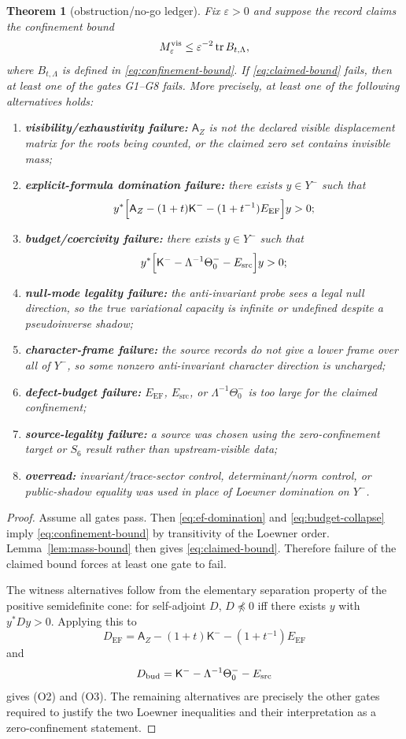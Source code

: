 \documentclass[11pt]{article}
\newtheorem{theorem}{Theorem}
\newcommand{\K}{\mathsf K}
\newcommand{\A}{\mathsf A}
\newcommand{\EF}{\mathrm{EF}}
\newcommand{\src}{\mathrm{src}}
\newcommand{\tr}{\operatorname{tr}}
\newcommand{\eps}{\varepsilon}
\begin{document}
\begin{theorem}[obstruction/no-go ledger]\label{thm:obstruction}
Fix $\eps>0$ and suppose the record claims the confinement bound
\begin{equation}\label{eq:claimed-bound}
M_{\eps}^{\rm vis}\le \eps^{-2}\tr B_{t,\Lambda},
\end{equation}
where $B_{t,\Lambda}$ is defined in \eqref{eq:confinement-bound}.  If \eqref{eq:claimed-bound} fails, then at least one of the gates G1--G8 fails.  More precisely, at least one of the following alternatives holds:
\begin{enumerate}[label=(O\arabic*),leftmargin=3em]
  \item \textbf{visibility/exhaustivity failure:} $\A_Z$ is not the declared visible displacement matrix for the roots being counted, or the claimed zero set contains invisible mass;
  \item \textbf{explicit-formula domination failure:} there exists $y\in Y^-$ such that
  \[
  y^*\Bigl[\A_Z-(1+t)\K^--(1+t^{-1})E_{\EF}\Bigr]y>0;
  \]
  \item \textbf{budget/coercivity failure:} there exists $y\in Y^-$ such that
  \[
  y^*\Bigl[\K^--\Lambda^{-1}\Theta_0^- -E_{\src}\Bigr]y>0;
  \]
  \item \textbf{null-mode legality failure:} the anti-invariant probe sees a legal null direction, so the true variational capacity is infinite or undefined despite a pseudoinverse shadow;
  \item \textbf{character-frame failure:} the source records do not give a lower frame over all of $Y^-$, so some nonzero anti-invariant character direction is uncharged;
  \item \textbf{defect-budget failure:} $E_{\EF}$, $E_{\src}$, or $\Lambda^{-1}\Theta_0^-$ is too large for the claimed confinement;
  \item \textbf{source-legality failure:} a source was chosen using the zero-confinement target or $S_6$ result rather than upstream-visible data;
  \item \textbf{overread:} invariant/trace-sector control, determinant/norm control, or public-shadow equality was used in place of Loewner domination on $Y^-$.
\end{enumerate}
\end{theorem}

\begin{proof}
Assume all gates pass.  Then \eqref{eq:ef-domination} and \eqref{eq:budget-collapse} imply \eqref{eq:confinement-bound} by transitivity of the Loewner order.  Lemma~\ref{lem:mass-bound} then gives \eqref{eq:claimed-bound}.  Therefore failure of the claimed bound forces at least one gate to fail.

The witness alternatives follow from the elementary separation property of the positive semidefinite cone: for self-adjoint $D$, $D\npreceq0$ iff there exists $y$ with $y^*Dy>0$.  Applying this to
\[
D_{\EF}=\A_Z-(1+t)\K^--(1+t^{-1})E_{\EF}
\]
and
\[
D_{\rm bud}=\K^- -\Lambda^{-1}\Theta_0^- -E_{\src}
\]
gives (O2) and (O3).  The remaining alternatives are precisely the other gates required to justify the two Loewner inequalities and their interpretation as a zero-confinement statement.
\end{proof}
\end{document}
